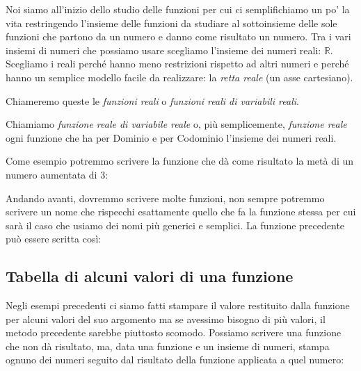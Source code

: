 Noi siamo all'inizio dello studio delle funzioni per cui ci 
semplifichiamo un po' la vita restringendo l'insieme delle funzioni da 
studiare al sottoinsieme delle sole funzioni che partono da un numero e 
danno come risultato un numero. 
Tra i vari insiemi di numeri che possiamo usare scegliamo l'insieme dei 
numeri reali: \(\mathbb{R}\). Scegliamo i reali perché hanno meno restrizioni 
rispetto ad altri numeri e perché hanno un semplice modello facile da 
realizzare: 
la \emph{retta reale} (un asse cartesiano).

Chiameremo queste le \emph{funzioni reali} o 
\emph{funzioni reali di variabili reali}.

\begin{definizione}
Chiamiamo \emph{funzione reale di variabile reale} o, più 
semplicemente, \emph{funzione reale} ogni funzione che ha per Dominio e 
per Codominio l'insieme dei numeri reali.
\end{definizione}

\begin{esempio}
Come esempio potremmo scrivere la funzione che dà come risultato la metà di 
un numero aumentata di 3:


\end{esempio}

Andando avanti, dovremmo scrivere molte funzioni, non sempre potremmo 
scrivere un nome che rispecchi esattamente quello che fa la funzione stessa 
per cui sarà il caso che usiamo dei nomi più generici e semplici. 
La funzione precedente può essere scritta così:


\subsection{Tabella di alcuni valori di una funzione}

Negli esempi precedenti ci siamo fatti stampare il valore restituito dalla 
funzione per alcuni valori del suo argomento ma se avessimo bisogno di più 
valori, il metodo precedente sarebbe piuttosto scomodo. Possiamo scrivere 
una funzione che non dà risultato, ma, data una funzione e un insieme di 
numeri, stampa ognuno dei numeri seguito dal risultato della funzione 
applicata a quel numero:


